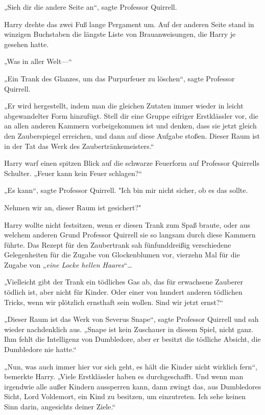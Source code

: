 {„Sieh dir die andere Seite an“, sagte Professor Quirrell.

Harry drehte das zwei Fuß lange Pergament um. Auf der anderen Seite stand in winzigen Buchstaben die längste Liste von Brauanweisungen, die Harry je gesehen hatte.

„Was in aller Welt—“

„Ein Trank des Glanzes, um das Purpurfeuer zu löschen“, sagte Professor Quirrell.

„Er wird hergestellt, indem man die gleichen Zutaten immer wieder in leicht abgewandelter Form hinzufügt. Stell dir eine Gruppe eifriger Erstklässler vor, die an allen anderen Kammern vorbeigekommen ist und denken, dass sie jetzt gleich den Zauberspiegel erreichen, und dann auf diese Aufgabe stoßen. Dieser Raum ist in der Tat das Werk des Zaubertränkemeisters.“

Harry warf einen spitzen Blick auf die schwarze Feuerform auf Professor Quirrells Schulter. „Feuer kann kein Feuer schlagen?“

„Es kann“, sagte Professor Quirrell. "Ich bin mir nicht sicher, ob es das sollte.

Nehmen wir an, dieser Raum ist gesichert?"

Harry wollte nicht festsitzen, wenn er diesen Trank zum Spaß braute, oder aus welchem anderen Grund Professor Quirrell sie so langsam durch diese Kammern führte. Das Rezept für den Zaubertrank sah fünfunddreißig verschiedene Gelegenheiten für die Zugabe von Glockenblumen vor, vierzehn Mal für die Zugabe von „\emph{eine Locke hellen Haares}“…

„Vielleicht gibt der Trank ein tödliches Gas ab, das für erwachsene Zauberer tödlich ist, aber nicht für Kinder. Oder einer von hundert anderen tödlichen Tricks, wenn wir plötzlich ernsthaft sein wollen. Sind wir jetzt ernst?“

„Dieser Raum ist das Werk von Severus Snape“, sagte Professor Quirrell und sah wieder nachdenklich aus. „Snape ist kein Zuschauer in diesem Spiel, nicht ganz. Ihm fehlt die Intelligenz von Dumbledore, aber er besitzt die tödliche Absicht, die Dumbledore nie hatte.“

„Nun, was auch immer hier vor sich geht, es hält die Kinder nicht wirklich fern“, bemerkte Harry. „Viele Erstklässler haben es durchgeschafft. Und wenn man irgendwie alle außer Kindern aussperren kann, dann zwingt das, aus Dumbledores Sicht, Lord Voldemort, ein Kind zu besitzen, um einzutreten. Ich sehe keinen Sinn darin, angesichts deiner Ziele.“

}
